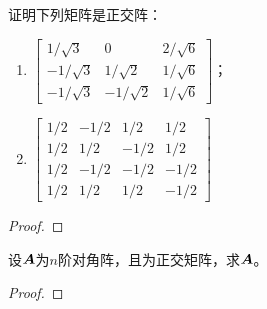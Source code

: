 \begin{problem}
证明下列矩阵是正交阵：
\begin{enumerate}
    \item \(\begin{bmatrix}
              1/\sqrt{3}  & 0           & 2/\sqrt{6} \\
              -1/\sqrt{3} & 1/\sqrt{2}  & 1/\sqrt{6} \\
              -1/\sqrt{3} & -1/\sqrt{2} & 1/\sqrt{6}
          \end{bmatrix}\)；
    \item \(\begin{bmatrix}
              1/2 & -1/2 & 1/2  & 1/2  \\
              1/2 & 1/2  & -1/2 & 1/2  \\
              1/2 & -1/2 & -1/2 & -1/2 \\
              1/2 & 1/2  & 1/2  & -1/2
          \end{bmatrix}\)
\end{enumerate}
\end{problem}
\begin{proof}

\end{proof}

\begin{problem}
设\(\boldsymbol{A}\)为\(n\)阶对角阵，且为正交矩阵，求\(\boldsymbol{A}\)。
\end{problem}
\begin{proof}

\end{proof}